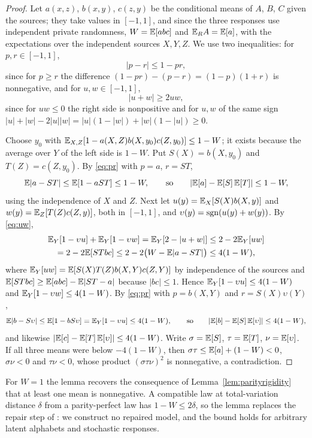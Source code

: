 \begin{proof}
Let $a(x,z)$, $b(x,y)$, $c(z,y)$ be the conditional means of $A$, $B$, $C$ given the sources; they take values in $[-1,1]$, and since the three responses use independent private randomness, $W=\mathbb E[abc]$ and $\mathbb E_RA=\mathbb E[a]$, with the expectations over the independent sources $X,Y,Z$. We use two inequalities: for $p,r\in[-1,1]$,
\begin{equation}\label{eq:pr}
|p-r|\le1-pr,
\end{equation}
since for $p\ge r$ the difference $(1-pr)-(p-r)=(1-p)(1+r)$ is nonnegative, and for $u,w\in[-1,1]$,
\begin{equation}\label{eq:uw}
|u+w|\ge2uw,
\end{equation}
since for $uw\le0$ the right side is nonpositive and for $u,w$ of the same sign $|u|+|w|-2|u||w|=|u|(1-|w|)+|w|(1-|u|)\ge0$.

Choose $y_0$ with $\mathbb E_{X,Z}[1-a(X,Z)b(X,y_0)c(Z,y_0)]\le1-W$; it exists because the average over $Y$ of the left side is $1-W$. Put $S(X)=b(X,y_0)$ and $T(Z)=c(Z,y_0)$. By \eqref{eq:pr} with $p=a$, $r=ST$,
\[
\mathbb E|a-ST|\le\mathbb E[1-aST]\le1-W,\qquad\text{so}\qquad |\mathbb E[a]-\mathbb E[S]\,\mathbb E[T]|\le1-W,
\]
using the independence of $X$ and $Z$. Next let $u(y)=\mathbb E_X[S(X)b(X,y)]$ and $w(y)=\mathbb E_Z[T(Z)c(Z,y)]$, both in $[-1,1]$, and $\upsilon(y)=\operatorname{sgn}(u(y)+w(y))$. By \eqref{eq:uw},
\begin{multline*}
\mathbb E_Y[1-\upsilon u]+\mathbb E_Y[1-\upsilon w]=\mathbb E_Y[2-|u+w|]\le2-2\mathbb E_Y[uw]\\
=2-2\mathbb E[STbc]\le2-2\bigl(W-\mathbb E|a-ST|\bigr)\le4(1-W),
\end{multline*}
where $\mathbb E_Y[uw]=\mathbb E[S(X)T(Z)b(X,Y)c(Z,Y)]$ by independence of the sources and $\mathbb E[STbc]\ge\mathbb E[abc]-\mathbb E|ST-a|$ because $|bc|\le1$. Hence $\mathbb E_Y[1-\upsilon u]\le4(1-W)$ and $\mathbb E_Y[1-\upsilon w]\le4(1-W)$. By \eqref{eq:pr} with $p=b(X,Y)$ and $r=S(X)\upsilon(Y)$,
\[
\mathbb E|b-S\upsilon|\le\mathbb E[1-bS\upsilon]=\mathbb E_Y[1-\upsilon u]\le4(1-W),\qquad\text{so}\qquad|\mathbb E[b]-\mathbb E[S]\,\mathbb E[\upsilon]|\le4(1-W),
\]
and likewise $|\mathbb E[c]-\mathbb E[T]\,\mathbb E[\upsilon]|\le4(1-W)$. Write $\sigma=\mathbb E[S]$, $\tau=\mathbb E[T]$, $\nu=\mathbb E[\upsilon]$. If all three means were below $-4(1-W)$, then $\sigma\tau\le\mathbb E[a]+(1-W)<0$, $\sigma\nu<0$ and $\tau\nu<0$, whose product $(\sigma\tau\nu)^2$ is nonnegative, a contradiction.
\end{proof}
For $W=1$ the lemma recovers the consequence of Lemma~\ref{lem:parityrigidity} that at least one mean is nonnegative. A compatible law at total-variation distance $\delta$ from a parity-perfect law has $1-W\le2\delta$, so the lemma replaces the repair step of \cite{BoreiriEtAl2025}: we construct no repaired model, and the bound holds for arbitrary latent alphabets and stochastic responses.

